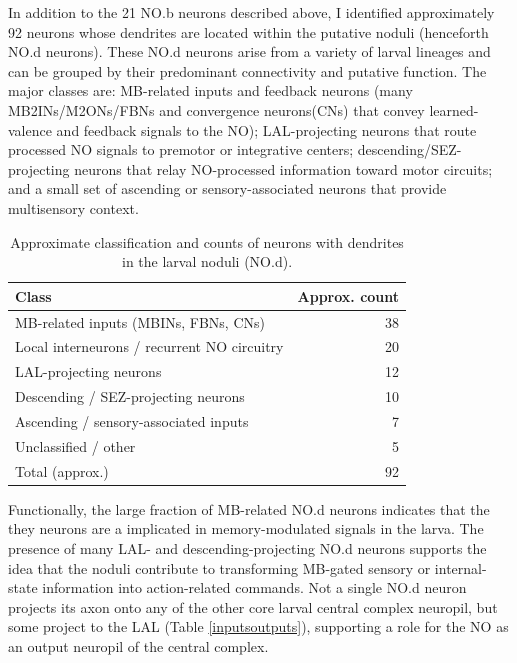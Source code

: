     In addition to the 21 NO.b neurons described above, I identified approximately 92 neurons whose dendrites are located within the putative noduli (henceforth NO.d neurons). These NO.d neurons arise from a variety of larval lineages and can be grouped by their predominant connectivity and putative function. The major classes are: MB-related inputs and feedback neurons (many MB2INs/M2ONs/FBNs and convergence neurons(CNs) that convey learned-valence and feedback signals to the NO); LAL-projecting neurons that route processed NO signals to premotor or integrative centers; descending/SEZ-projecting neurons that relay NO-processed information toward motor circuits; and a small set of ascending or sensory-associated neurons that provide multisensory context.

    \begin{table}[h!]
    \centering
    \begin{tabular}{l r}
    \toprule
    Class & Approx. count \\
    \midrule
    MB-related inputs (MBINs, FBNs, CNs) & 38 \\
    Local interneurons / recurrent NO circuitry & 20 \\
    LAL-projecting neurons & 12 \\
    Descending / SEZ-projecting neurons & 10 \\
    Ascending / sensory-associated inputs & 7 \\
    Unclassified / other & 5 \\
    \midrule
    Total (approx.) & 92 \\
    \bottomrule
    \end{tabular}
    \caption[Summary of NO.d neurons]{Approximate classification and counts of neurons with dendrites in the larval noduli (NO.d).}
    \label{NOd_summary}
    \end{table}

    Functionally, the large fraction of MB-related NO.d neurons indicates that the they neurons are a implicated in memory-modulated signals in the larva. The presence of many LAL- and descending-projecting NO.d neurons supports the idea that the noduli contribute to transforming MB-gated sensory or internal-state information into action-related commands.
    Not a single NO.d neuron projects its axon onto any of the other core larval central complex neuropil, but some project to the LAL (Table \ref{inputsoutputs}), supporting a role for the NO as an output neuropil of the central complex.



